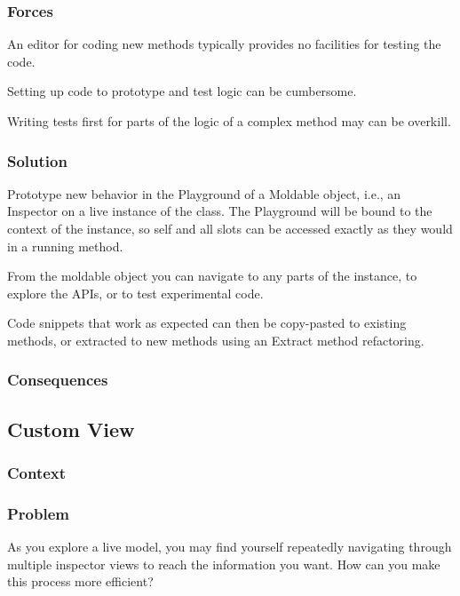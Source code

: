 \documentclass[sigconf]{acmart}
\begin{document}
\subsubsection*{Forces}

An editor for coding new methods typically provides no facilities for testing the code.

Setting up code to prototype and test logic can be cumbersome.

Writing tests first for parts of the logic of a complex method may can be overkill.

\subsubsection*{Solution}

Prototype new behavior in the Playground of a Moldable object, i.e., an Inspector on a live instance of the class. The Playground will be bound to the context of the instance, so self and all slots can be accessed exactly as they would in a running method.

From the moldable object you can navigate to any parts of the instance, to explore the APIs, or to test experimental code.

Code snippets that work as expected can then be copy-pasted to existing methods, or extracted to new methods using an Extract method refactoring.


\subsubsection*{Consequences}

\subsection*{Custom View}\label{pat:customView}
\subsubsection*{Context}
\subsubsection*{Problem}

As you explore a live model, you may find yourself repeatedly navigating through multiple inspector views to reach the information you want. How can you make this process more efficient?
\end{document}
